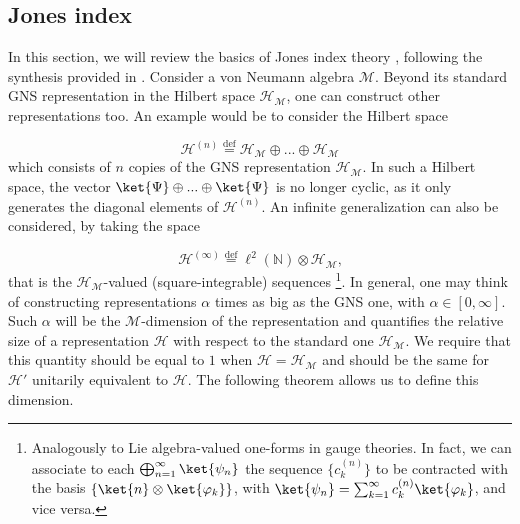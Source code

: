 \documentclass[a4paper,11pt]{article}
\newcommand{\eqdef}{\overset{\mathrm{def}}{=}}
\begin{document}
\subsection{Jones index}

In this section, we will review the basics of Jones index theory \cite{Jones}, following the synthesis provided in \cite{Verlinde}. Consider a von Neumann algebra $\mathcal{M}$. Beyond its standard GNS representation in the Hilbert space $\mathcal{H}_{\mathcal{M}}$, one can construct other representations too. An example would be to consider the Hilbert space

\begin{equation}
    \mathcal{H}^{(n)} \eqdef \mathcal{H}_{\mathcal{M}} \oplus ... \oplus \mathcal{H}_{\mathcal{M}}
\end{equation}
%
which consists of $n$ copies of the GNS representation $\mathcal{H}_{\mathcal{M}}$. In such a Hilbert space, the vector $\ket{\Psi} \oplus ... \oplus \ket{\Psi}$ is no longer cyclic, as it only generates the diagonal elements of $\mathcal{H}^{(n)}$. An infinite generalization can also be considered, by taking the space

\begin{equation}
    \mathcal{H}^{(\infty)} \eqdef \ell^2(\mathbb{N}) \otimes \mathcal{H}_{\mathcal{M}} \text{,}
\end{equation}
%
that is the $\mathcal{H}_{\mathcal{M}}$-valued (square-integrable) sequences \footnote{Analogously to Lie algebra-valued one-forms in gauge theories. In fact, we can associate to each $\bigoplus_{n=1}^{\infty} \ket{\psi_n}$ the sequence $\{ c_k^{(n)} \}$ to be contracted with the basis $\{ \ket{n} \otimes \ket{\varphi_k} \}$, with $\ket{\psi_n} = \sum_{k=1}^{\infty} c_k^{(n)} \ket{\varphi_k}$, and vice versa.}. In general, one may think of constructing representations $\alpha$ times as big as the GNS one, with $\alpha \in [0, \infty]$. Such $\alpha$ will be the $\mathcal{M}$-dimension of the representation and quantifies the relative size of a representation $\mathcal{H}$ with respect to the standard one $\mathcal{H}_{\mathcal{M}}$. We require that this quantity should be equal to $1$ when $\mathcal{H} = \mathcal{H}_{\mathcal{M}}$ and should be the same for $\mathcal{H}'$ unitarily equivalent to $\mathcal{H}$. The following theorem allows us to define this dimension.
\end{document}
